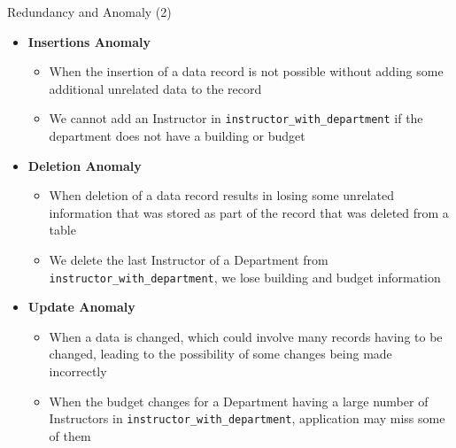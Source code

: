 \documentclass[aspectratio=169, xcolor=dvipsnames]{beamer}
\begin{document}
\begin{frame}{Redundancy and Anomaly (2)}
    \begin{itemize}[<+->]
        \item \textbf{Insertions Anomaly}
        \begin{itemize}
            \item[$\triangleright$] When the insertion of a data record is not possible without adding some additional unrelated data to the record
            \item[$\triangleright$] We cannot add an Instructor in \texttt{instructor\_with\_department} if the department does not have a building or budget
        \end{itemize}
        \item \textbf{Deletion Anomaly}
        \begin{itemize}
            \item[$\triangleright$] When deletion of a data record results in losing some unrelated information that was stored as part of the record that was deleted from a table
            \item[$\triangleright$] We delete the last Instructor of a Department from \texttt{instructor\_with\_department}, we lose building and budget information
        \end{itemize}
        \item \textbf{Update Anomaly}
        \begin{itemize}
            \item[$\triangleright$] When a data is changed, which could involve many records having to be changed, leading to the possibility of some changes being made incorrectly
            \item[$\triangleright$] When the budget changes for a Department having a large number of Instructors in \texttt{instructor\_with\_department}, application may miss some of them
        \end{itemize}
    \end{itemize}
\end{frame}
\end{document}
